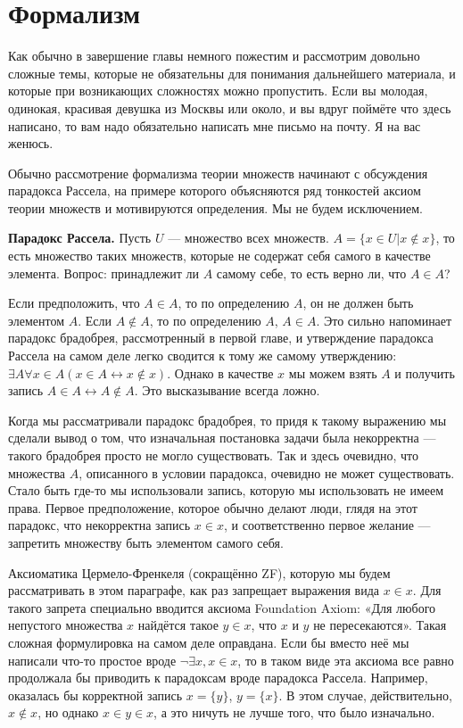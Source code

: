 \section{Формализм}

Как обычно в завершение главы немного пожестим и рассмотрим довольно сложные темы, которые не обязательны для понимания дальнейшего материала, и которые при возникающих сложностях можно пропустить. Если вы молодая, одинокая, красивая девушка из Москвы или около, и вы вдруг поймёте что здесь написано, то вам надо обязательно написать мне письмо на почту. Я на вас женюсь.

Обычно рассмотрение формализма теории множеств начинают с обсуждения парадокса Рассела, на примере которого объясняются ряд тонкостей аксиом теории множеств и мотивируются определения. Мы не будем исключением.

{\bfseries Парадокс Рассела.} Пусть $U$ — множество всех множеств. $A = \{x\in U|x\not\in x\}$, то есть множество таких множеств, которые не содержат себя самого в качестве элемента. Вопрос: принадлежит ли $A$ самому себе, то есть верно ли, что $A\in A$?

Если предположить, что $A\in A$, то по определению $A$, он не должен быть элементом $A$. Если $A\not\in A$, то по определению $A$, $A \in A$. Это сильно напоминает парадокс брадобрея, рассмотренный в первой главе, и утверждение парадокса Рассела на самом деле легко сводится к тому же самому утверждению: $\exists A\forall x\in A (x\in A \leftrightarrow x\not\in x)$. Однако в качестве $x$ мы можем взять $A$ и получить запись $A\in A \leftrightarrow A\not\in A$. Это высказывание всегда ложно.

Когда мы рассматривали парадокс брадобрея, то придя к такому выражению мы сделали вывод о том, что изначальная постановка задачи была некорректна — такого брадобрея просто не могло существовать. Так и здесь очевидно, что множества $A$, описанного в условии парадокса, очевидно не может существовать. Стало быть где-то мы использовали запись, которую мы использовать не имеем права. Первое предположение, которое обычно делают люди, глядя на этот парадокс, что некорректна запись $x\in x$, и соответственно первое желание — запретить множеству быть элементом самого себя.

Аксиоматика Цермело-Френкеля (сокращённо ZF), которую мы будем рассматривать в этом параграфе, как раз запрещает выражения вида $x\in x$. Для такого запрета специально вводится аксиома Foundation Axiom: «Для любого непустого множества $x$ найдётся такое $y\in x$, что $x$ и $y$ не пересекаются». Такая сложная формулировка на самом деле оправдана. Если бы вместо неё мы написали что-то простое вроде $\neg \exists x, x\in x$, то в таком виде эта аксиома все равно продолжала бы приводить к парадоксам вроде парадокса Рассела. Например, оказалась бы корректной запись $x=\{y\}$, $y=\{x\}$. В этом случае, действительно, $x\not\in x$, но однако $x\in y\in x$, а это ничуть не лучше того, что было изначально.


